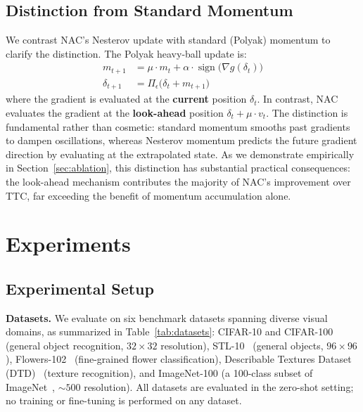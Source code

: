 \documentclass[pdflatex,sn-basic,Numbered]{sn-jnl}
\theoremstyle{thmstyleone}
\theoremstyle{thmstyletwo}
\theoremstyle{thmstylethree}
\begin{document}
\subsection{Distinction from Standard Momentum}

We contrast NAC's Nesterov update with standard (Polyak) momentum to clarify the distinction. The Polyak heavy-ball update is:
\begin{align}
m_{t+1} &= \mu \cdot m_t + \alpha \cdot \operatorname{sign}\!\big(\nabla g(\delta_t)\big) \label{eq:polyak} \\
\delta_{t+1} &= \Pi_{\epsilon}\!\big(\delta_t + m_{t+1}\big)
\end{align}
where the gradient is evaluated at the \textbf{current} position $\delta_t$. In contrast, NAC evaluates the gradient at the \textbf{look-ahead} position $\delta_t + \mu \cdot v_t$. The distinction is fundamental rather than cosmetic: standard momentum smooths past gradients to dampen oscillations, whereas Nesterov momentum predicts the future gradient direction by evaluating at the extrapolated state. As we demonstrate empirically in Section~\ref{sec:ablation}, this distinction has substantial practical consequences: the look-ahead mechanism contributes the majority of NAC's improvement over TTC, far exceeding the benefit of momentum accumulation alone.

\section{Experiments}\label{sec:experiments}

\subsection{Experimental Setup}

\textbf{Datasets.} We evaluate on six benchmark datasets spanning diverse visual domains, as summarized in Table~\ref{tab:datasets}: CIFAR-10 and CIFAR-100~\cite{krizhevsky2009learning} (general object recognition, $32\times32$ resolution), STL-10~\cite{coates2011analysis} (general objects, $96\times96$), Flowers-102~\cite{nilsback2008automated} (fine-grained flower classification), Describable Textures Dataset (DTD)~\cite{cimpoi2014describing} (texture recognition), and ImageNet-100 (a 100-class subset of ImageNet~\cite{deng2009imagenet}, ${\sim}500$ resolution). All datasets are evaluated in the zero-shot setting; no training or fine-tuning is performed on any dataset.
\end{document}
